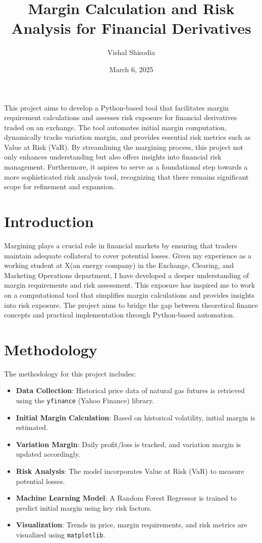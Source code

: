 \documentclass[a4paper,12pt]{article}
\title{\textbf{Margin Calculation and Risk Analysis for Financial Derivatives}}
\author{Vishal Shisodia}
\date{March 6, 2025}
\begin{document}
\maketitle

This project aims to develop a Python-based tool that facilitates margin requirement calculations and assesses risk exposure for financial derivatives traded on an exchange. The tool automates initial margin computation, dynamically tracks variation margin, and provides essential risk metrics such as Value at Risk (VaR). By streamlining the margining process, this project not only enhances understanding but also offers insights into financial risk management. Furthermore, it aspires to serve as a foundational step towards a more sophisticated risk analysis tool, recognizing that there remains significant scope for refinement and expansion.


\section{Introduction}
Margining plays a crucial role in financial markets by ensuring that traders maintain adequate collateral to cover potential losses. Given my experience as a working student at X(an energy company) in the Exchange, Clearing, and Marketing Operations department, I have developed a deeper understanding of margin requirements and risk assessment. This exposure has inspired me to work on a computational tool that simplifies margin calculations and provides insights into risk exposure. The project aims to bridge the gap between theoretical finance concepts and practical implementation through Python-based automation.

\section{Methodology}
The methodology for this project includes:
\begin{itemize}
    \item \textbf{Data Collection}: Historical price data of natural gas futures is retrieved using the \texttt{yfinance} (Yahoo Finance) library.
    \item \textbf{Initial Margin Calculation}: Based on historical volatility, initial margin is estimated.
    \item \textbf{Variation Margin}: Daily profit/loss is tracked, and variation margin is updated accordingly.
    \item \textbf{Risk Analysis}: The model incorporates Value at Risk (VaR) to measure potential losses.
    \item \textbf{Machine Learning Model}: A Random Forest Regressor is trained to predict initial margin using key risk factors.
    \item \textbf{Visualization}: Trends in price, margin requirements, and risk metrics are visualized using \texttt{matplotlib}.
\end{itemize}
\end{document}

